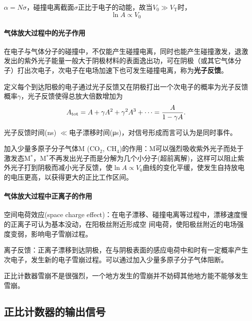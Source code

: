 $\alpha=N\sigma$，碰撞电离截面$\sigma$正比于电子的动能，故当$V_0\gg V_\mathrm T$时，
\[
	\ln A\propto V_0
\]
\paragraph{气体放大过程中的光子作用}
在电子与气体分子的碰撞中，不仅能产生碰撞电离，同时也能产生碰撞激发，退激发出的紫外光子能量一般大于阴极材料的表面逸出功，可在阴极（或其它气体分子）打出次电子，次电子在电场加速下也可发生碰撞电离，称为\textbf{光子反馈}。

定义每个到达阳极的电子通过光子反馈又在阴极打出一个次电子的概率为光子反馈概率$\gamma$，光子反馈使得总放大倍数增加为
\[
	A_\mathrm{tot}=A+\gamma A^2+\gamma^2A^3+\cdots=\frac A{1-\gamma A}.
\]

\begin{compactitem}
	\item 光子反馈时间(\si{ns}) $\ll$电子漂移时间(\si{\micro s})，对信号形成而言可认为是同时事件。
	\item 加入少量多原子分子气体M (CO$_2$, CH$_4$)的作用：M可以强烈吸收紫外光子而处于激发态M$^*$，M$^\ast$不再发出光子而是分解为几个小分子(超前离解)，这样可以阻止紫外光子打到阴极而减小光子反馈，使$\ln A\propto V_0$曲线的变化平缓，使发生自持放电的电压更高，以获得更大的正比工作区间。
\end{compactitem}
\paragraph{气体放大过程中正离子的作用}
空间电荷效应(space charge effect)：在电子漂移、碰撞电离等过程中，漂移速度慢的正离子可认为基本没动，在阳极丝附近形成空
间电荷，使阳极丝附近的电场强度变弱，影响电子雪崩过程。%

离子反馈：正离子漂移到达阴极，在与阴极表面的感应电荷中和时有一定概率产生次电子，发生新的电子雪崩过程。可以通过加入少量多原子分子气体阻断。

正比计数器雪崩不是很强烈，一个地方发生的雪崩并不妨碍其他地方能不能够发生雪崩。

\subsection{正比计数器的输出信号}

